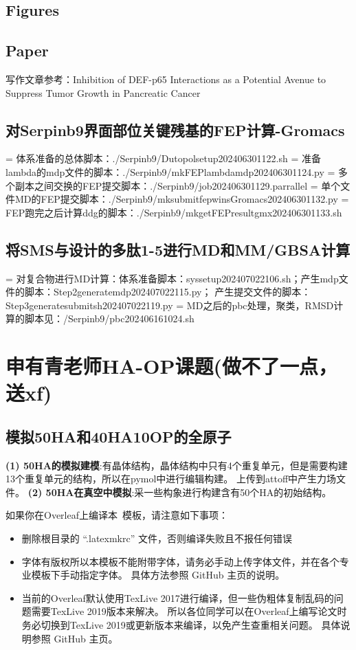 \subsection{Figures}
\subsection{Paper}
\noindent 写作文章参考：Inhibition of DEF-p65 Interactions as a Potential Avenue to Suppress Tumor Growth in Pancreatic Cancer  
\subsection{对Serpinb9界面部位关键残基的FEP计算-Gromacs}
\noindent = 体系准备的总体脚本：./Serpinb9/Dutopolsetup202406301122.sh
\newline = 准备lambda的mdp文件的脚本：./Serpinb9/mkFEPlambdamdp202406301124.py
\newline = 多个副本之间交换的FEP提交脚本：./Serpinb9/job202406301129.parrallel
\newline = 单个文件MD的FEP提交脚本：./Serpinb9/mksubmitfepwinsGromacs202406301132.py
\newline = FEP跑完之后计算ddg的脚本：./Serpinb9/mkgetFEPresultgmx202406301133.sh
\subsection{将SMS与设计的多肽1-5进行MD和MM/GBSA计算}
\noindent = 对复合物进行MD计算：体系准备脚本：syssetup202407022106.sh；产生mdp文件的脚本：Step2generatemdp202407022115.py；
产生提交文件的脚本：Step3generatesubmitsh202407022119.py
\newline = MD之后的pbc处理，聚类，RMSD计算的脚本见：/Serpinb9/pbc202406161024.sh
\section{申有青老师HA-OP课题(做不了一点，送xf)}
\subsection{模拟50HA和40HA10OP的全原子}
\noindent\textbf{(1) 50HA的模拟建模}:有晶体结构，晶体结构中只有4个重复单元，但是需要构建13个重复单元的结构，所以在pymol中进行编辑构建。
上传到attoff中产生力场文件。
\noindent\textbf{(2) 50HA在真空中模拟}:采一些构象进行构建含有50个HA的初始结构。

如果你在Overleaf上编译本~\cite{zjuthesisrules}模板，请注意如下事项：

\begin{itemize}
    \item 删除根目录的 ``.latexmkrc'' 文件，否则编译失败且不报任何错误
    \item 字体有版权所以本模板不能附带字体，请务必手动上传字体文件，并在各个专业模板下手动指定字体。
        具体方法参照 GitHub 主页的说明。
    \item 当前的Overleaf默认使用TexLive 2017进行编译，但一些伪粗体复制乱码的问题需要TexLive 2019版本来解决。
        所以各位同学可以在Overleaf上编写论文时务必切换到TexLive 2019或更新版本来编译，以免产生查重相关问题。
        具体说明参照 GitHub 主页。
\end{itemize}


